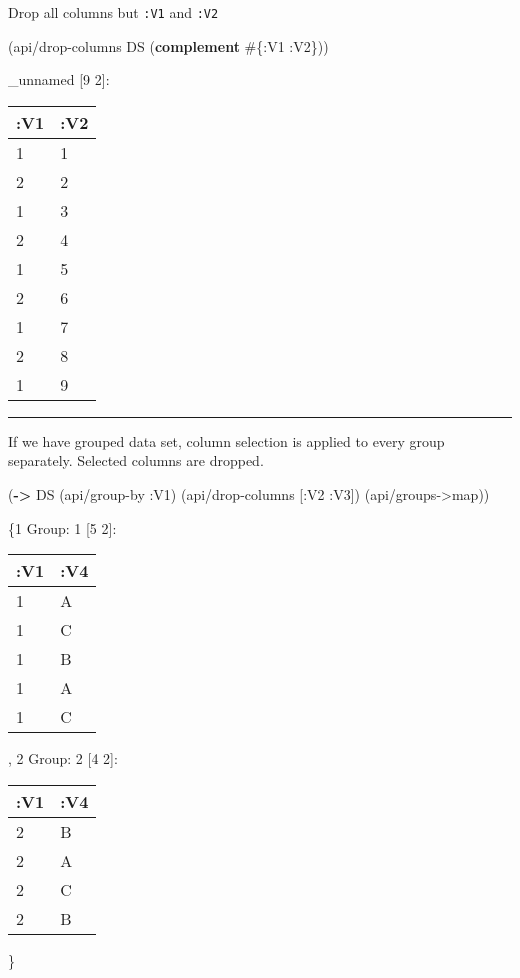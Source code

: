 \documentclass[]{article}
\newenvironment{Shaded}{\begin{snugshade}}{\end{snugshade}}
\newcommand{\AttributeTok}[1]{\textcolor[rgb]{0.77,0.63,0.00}{#1}}
\newcommand{\KeywordTok}[1]{\textcolor[rgb]{0.13,0.29,0.53}{\textbf{#1}}}
\newcommand{\NormalTok}[1]{#1}
\begin{document}
Drop all columns but \texttt{:V1} and \texttt{:V2}

\begin{Shaded}
\begin{Highlighting}[]
\NormalTok{(api/drop-columns DS (}\KeywordTok{complement}\NormalTok{ #\{}\AttributeTok{:V1} \AttributeTok{:V2}\NormalTok{\}))}
\end{Highlighting}
\end{Shaded}

\_unnamed {[}9 2{]}:

\begin{longtable}[]{@{}ll@{}}
\toprule
:V1 & :V2\tabularnewline
\midrule
\endhead
1 & 1\tabularnewline
2 & 2\tabularnewline
1 & 3\tabularnewline
2 & 4\tabularnewline
1 & 5\tabularnewline
2 & 6\tabularnewline
1 & 7\tabularnewline
2 & 8\tabularnewline
1 & 9\tabularnewline
\bottomrule
\end{longtable}

\begin{center}\rule{0.5\linewidth}{0.5pt}\end{center}

If we have grouped data set, column selection is applied to every group
separately. Selected columns are dropped.

\begin{Shaded}
\begin{Highlighting}[]
\NormalTok{(}\KeywordTok{->}\NormalTok{ DS}
\NormalTok{    (api/group-by }\AttributeTok{:V1}\NormalTok{)}
\NormalTok{    (api/drop-columns [}\AttributeTok{:V2} \AttributeTok{:V3}\NormalTok{])}
\NormalTok{    (api/groups->map))}
\end{Highlighting}
\end{Shaded}

\{1 Group: 1 {[}5 2{]}:

\begin{longtable}[]{@{}ll@{}}
\toprule
:V1 & :V4\tabularnewline
\midrule
\endhead
1 & A\tabularnewline
1 & C\tabularnewline
1 & B\tabularnewline
1 & A\tabularnewline
1 & C\tabularnewline
\bottomrule
\end{longtable}

, 2 Group: 2 {[}4 2{]}:

\begin{longtable}[]{@{}ll@{}}
\toprule
:V1 & :V4\tabularnewline
\midrule
\endhead
2 & B\tabularnewline
2 & A\tabularnewline
2 & C\tabularnewline
2 & B\tabularnewline
\bottomrule
\end{longtable}

\}
\end{document}
